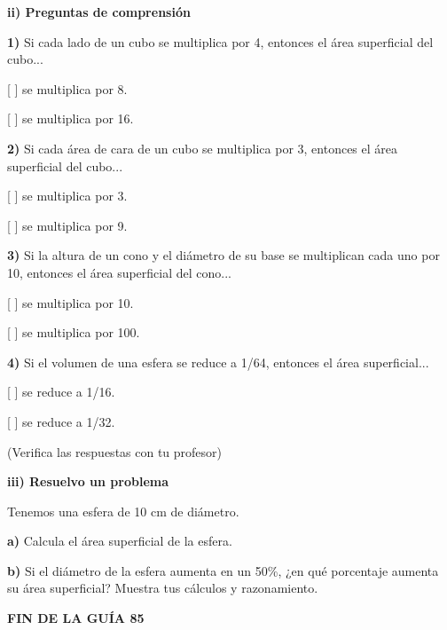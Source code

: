 \documentclass[12pt,a4paper]{article}
\begin{document}
\textbf{ii) Preguntas de comprensión}

\textbf{1)} Si cada lado de un cubo se multiplica por 4, entonces el área superficial del cubo...

[ ] se multiplica por 8.

[ ] se multiplica por 16.

\textbf{2)} Si cada área de cara de un cubo se multiplica por 3, entonces el área superficial del cubo...

[ ] se multiplica por 3.

[ ] se multiplica por 9.

\textbf{3)} Si la altura de un cono y el diámetro de su base se multiplican cada uno por 10, entonces el área superficial del cono...

[ ] se multiplica por 10.

[ ] se multiplica por 100.

\textbf{4)} Si el volumen de una esfera se reduce a 1/64, entonces el área superficial...

[ ] se reduce a 1/16.

[ ] se reduce a 1/32.

(Verifica las respuestas con tu profesor)

\vspace{4mm}


\textbf{iii) Resuelvo un problema}

Tenemos una esfera de 10 cm de diámetro.

\textbf{a)} Calcula el área superficial de la esfera.

\textbf{b)} Si el diámetro de la esfera aumenta en un 50\%, ¿en qué porcentaje aumenta su área superficial? Muestra tus cálculos y razonamiento.

\vfill

\begin{center}
\textbf{FIN DE LA GUÍA 85}
\end{center}
\end{document}
